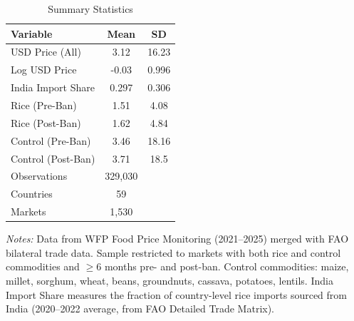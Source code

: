 \begin{table}[htbp]
\centering
\caption{Summary Statistics}
\label{tab:summary}
\begin{threeparttable}
\begin{tabular}{lcc}
\hline\hline
Variable & Mean & SD \\
\hline
USD Price (All) & 3.12 & 16.23 \\
Log USD Price & -0.03 & 0.996 \\
India Import Share & 0.297 & 0.306 \\
\quad Rice (Pre-Ban) & 1.51 & 4.08 \\
\quad Rice (Post-Ban) & 1.62 & 4.84 \\
\quad Control (Pre-Ban) & 3.46 & 18.16 \\
\quad Control (Post-Ban) & 3.71 & 18.5 \\
Observations & 329,030 & \\
Countries & 59 & \\
Markets & 1,530 & \\
\hline\hline
\end{tabular}
\begin{tablenotes}[flushleft]\small
\item \textit{Notes:} Data from WFP Food Price Monitoring (2021--2025) merged with FAO bilateral trade data. Sample restricted to markets with both rice and control commodities and $\geq$6 months pre- and post-ban. Control commodities: maize, millet, sorghum, wheat, beans, groundnuts, cassava, potatoes, lentils. India Import Share measures the fraction of country-level rice imports sourced from India (2020--2022 average, from FAO Detailed Trade Matrix).
\end{tablenotes}
\end{threeparttable}
\end{table}
